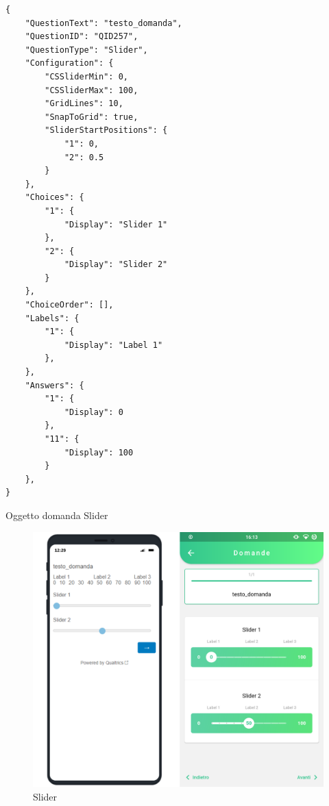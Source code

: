 \newpage
\begin{json}
\begin{verbatim}
{
    "QuestionText": "testo_domanda",
    "QuestionID": "QID257",
    "QuestionType": "Slider",
    "Configuration": {
        "CSSliderMin": 0,
        "CSSliderMax": 100,
        "GridLines": 10,
        "SnapToGrid": true,
        "SliderStartPositions": {
            "1": 0,
            "2": 0.5
        }
    },
    "Choices": {
        "1": {
            "Display": "Slider 1"
        },
        "2": {
            "Display": "Slider 2"
        }
    },
    "ChoiceOrder": [],
    "Labels": {
        "1": {
            "Display": "Label 1"
        },
    },
    "Answers": {
        "1": {
            "Display": 0
        },
        "11": {
            "Display": 100
        }
    },
}
\end{verbatim}
\caption{Oggetto domanda Slider}
\label{json:slider}
\end{json}

\begin{figure}[ht!]
\centering
\includegraphics[width=\textwidth]{img/slider}
\caption{Slider}
\label{fig:slider}
\end{figure}

\clearpage
